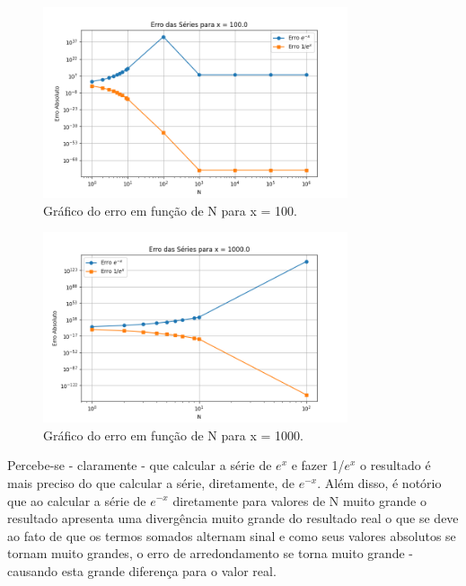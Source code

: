 \documentclass[12pt, a4paper]{article} %
\begin{document}
    \begin{figure}[H]
        \centering
        \includegraphics[width=0.8\textwidth]{../images/erro_x_100_0.png}
        \caption{Gr\'afico do erro em fun\c{c}\~ao de N para x = 100.}
    \end{figure}

    \begin{figure}[H]
        \centering
        \includegraphics[width=0.8\textwidth]{../images/erro_x_1000_0.png}
        \caption{Gr\'afico do erro em fun\c{c}\~ao de N para x = 1000.}
    \end{figure}

    Percebe-se - claramente - que calcular a s\'erie de $e^x$ e fazer 1/$e^x$ o resultado \'e mais preciso do que calcular a s\'erie, diretamente, de $e^{-x}$. Al\'em disso, \'e not\'orio que ao calcular a s\'erie de $e^{-x}$  diretamente para valores de N muito grande o resultado apresenta uma diverg\^encia muito grande do resultado real o que se deve ao fato de que os termos somados alternam sinal e como seus valores absolutos se tornam muito grandes, o erro de arredondamento se torna muito grande - causando esta grande diferen\c{c}a para o valor real.
\end{document}
